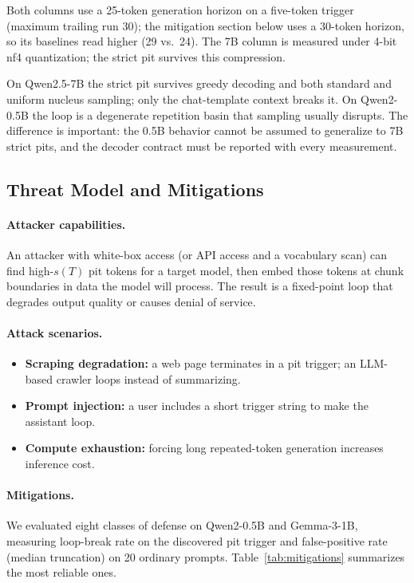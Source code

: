 \documentclass{article}
\begin{document}
Both columns use a 25-token generation horizon on a five-token trigger
(maximum trailing run 30); the mitigation section below uses a 30-token
horizon, so its baselines read higher (29 vs.\ 24). The 7B column is measured
under 4-bit nf4 quantization; the strict pit survives this compression.

On Qwen2.5-7B the strict pit survives greedy decoding and both standard and
uniform nucleus sampling; only the chat-template context breaks it. On
Qwen2-0.5B the loop is a degenerate repetition basin that sampling usually
disrupts. The difference is important: the 0.5B behavior cannot be assumed to
generalize to 7B strict pits, and the decoder contract must be reported with
every measurement.

\subsection{Threat Model and Mitigations}

\paragraph{Attacker capabilities.} An attacker with white-box access (or API
access and a vocabulary scan) can find high-$s(T)$ pit tokens for a target
model, then embed those tokens at chunk boundaries in data the model will
process. The result is a fixed-point loop that degrades output quality or
causes denial of service.

\paragraph{Attack scenarios.}
\begin{itemize}
\item \textbf{Scraping degradation:} a web page terminates in a pit trigger; an LLM-based crawler loops instead of summarizing.
\item \textbf{Prompt injection:} a user includes a short trigger string to make the assistant loop.
\item \textbf{Compute exhaustion:} forcing long repeated-token generation increases inference cost.
\end{itemize}

\paragraph{Mitigations.} We evaluated eight classes of defense on Qwen2-0.5B
and Gemma-3-1B, measuring loop-break rate on the discovered pit trigger and
false-positive rate (median truncation) on 20 ordinary prompts. Table~\ref{tab:mitigations}
summarizes the most reliable ones.
\end{document}

